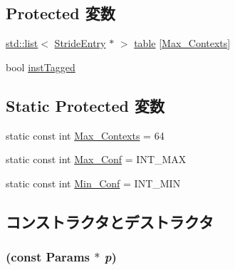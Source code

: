 \subsection*{Protected 変数}
\begin{DoxyCompactItemize}
\item 
\hyperlink{classstd_1_1list}{std::list}$<$ \hyperlink{classStridePrefetcher_1_1StrideEntry}{StrideEntry} $\ast$ $>$ \hyperlink{classStridePrefetcher_a55d29ec7c16821e665c5421be16cba2c}{table} \mbox{[}\hyperlink{classStridePrefetcher_abfd49f19b53f332f17db2798d9639ff7}{Max\_\-Contexts}\mbox{]}
\item 
bool \hyperlink{classStridePrefetcher_a319ba103fe2fee70bc0385243e15d100}{instTagged}
\end{DoxyCompactItemize}
\subsection*{Static Protected 変数}
\begin{DoxyCompactItemize}
\item 
static const int \hyperlink{classStridePrefetcher_abfd49f19b53f332f17db2798d9639ff7}{Max\_\-Contexts} = 64
\item 
static const int \hyperlink{classStridePrefetcher_af4f15f4ccef3f00f7ce22c987c42fc92}{Max\_\-Conf} = INT\_\-MAX
\item 
static const int \hyperlink{classStridePrefetcher_ac7ef7fbd9b695359dfcc4a03788a09d9}{Min\_\-Conf} = INT\_\-MIN
\end{DoxyCompactItemize}


\subsection{コンストラクタとデストラクタ}
\hypertarget{classStridePrefetcher_ad4f8b8679818dea805237ad9617e3f51}{
\subsubsection[{StridePrefetcher}]{ (const {\bf Params} $\ast$ {\em p})}}
\label{classStridePrefetcher_ad4f8b8679818dea805237ad9617e3f51}



